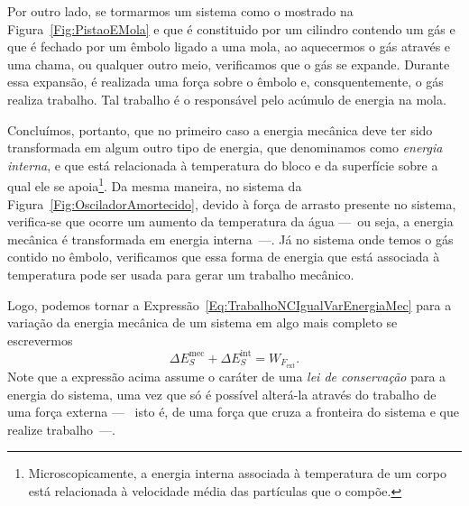 Por outro lado, se tormarmos um sistema como o mostrado na Figura~\ref{Fig:PistaoEMola} e que é constituido por um cilindro contendo um gás e que é fechado por um êmbolo ligado a uma mola, ao aquecermos o gás através e uma chama, ou qualquer outro meio, verificamos que o gás se expande. Durante essa expansão, é realizada uma força sobre o êmbolo e, consquentemente, o gás realiza trabalho. Tal trabalho é o responsável pelo acúmulo de energia na mola.

Concluímos, portanto, que no primeiro caso a energia mecânica deve ter sido transformada em algum outro tipo de energia, que denominamos como \emph{energia interna}, e que está relacionada à temperatura do bloco e da superfície sobre a qual ele se apoia\footnote{Microscopicamente, a energia interna associada à temperatura de um corpo está relacionada à velocidade média das partículas que o compõe.}. Da mesma maneira, no sistema da Figura~\ref{Fig:OsciladorAmortecido}, devido à força de arrasto presente no sistema, verifica-se que ocorre um aumento da temperatura da água ---~ou seja, a energia mecânica é transformada em energia interna~---. Já no sistema onde temos o gás contido no êmbolo, verificamos que essa forma de energia que  está associada à temperatura pode ser usada para gerar um trabalho mecânico.

Logo, podemos tornar a Expressão~\eqref{Eq:TrabalhoNCIgualVarEnergiaMec} para a variação da energia mecânica de um sistema em algo mais completo se escrevermos
\begin{equation}\label{Eq:ConservacaoDaEnergia1}
    \Delta E_S^{\textrm{mec}} + \Delta E_S^{\textrm{int}} = W_{F_{\textrm{ext}}}.
\end{equation}
%
Note que a expressão acima assume o caráter de uma \emph{lei de conservação} para a energia do sistema, uma vez que só é possível alterá-la através do trabalho de uma força externa ---~ isto é, de uma força que cruza a fronteira do sistema e que realize trabalho~---.

